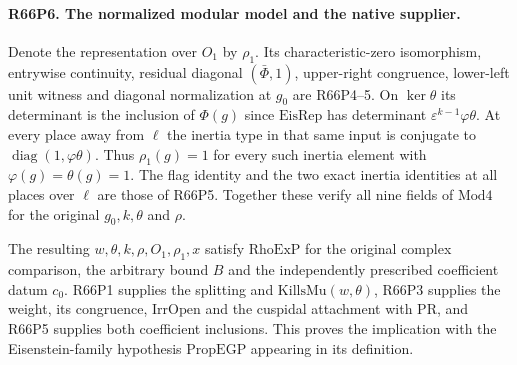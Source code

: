 \paragraph{R66P6. The normalized modular model and the native supplier.}
Denote the representation over $O_1$ by $\rho_1$. Its
characteristic-zero isomorphism, entrywise continuity, residual
diagonal $(\bar\Phi,1)$, upper-right congruence, lower-left unit
witness and diagonal normalization at $g_0$ are R66P4--5.
On $\ker\theta$ its determinant is the inclusion of $\Phi(g)$ since
$\mathrm{EisRep}$ has determinant $\varepsilon^{k-1}\varphi\theta$.
At every place away from $\ell$ the inertia type in that same input
is conjugate to $\operatorname{diag}(1,\varphi\theta)$. Thus
$\rho_1(g)=1$ for every such inertia element with
$\varphi(g)=\theta(g)=1$.
The flag identity and the two exact inertia identities at all places
over $\ell$ are those of R66P5. Together these verify all nine
fields of $\mathrm{Mod4}$ for the original $g_0,k,\theta$ and $\rho$.

The resulting $w,\theta,k,\rho,O_1,\rho_1,x$ satisfy
$\mathrm{RhoExP}$ for the original complex comparison, the
arbitrary bound $B$ and the independently prescribed coefficient
datum $c_0$. R66P1 supplies the splitting and
$\mathrm{KillsMu}(w,\theta)$, R66P3 supplies the weight, its
congruence, $\mathrm{IrrOpen}$ and the cuspidal attachment with
$\mathrm{PR}$, and R66P5 supplies both coefficient inclusions.
This proves the implication with the Eisenstein-family hypothesis
$\mathrm{PropEGP}$ appearing in its definition.
